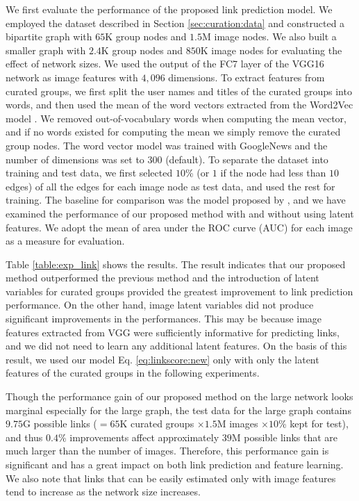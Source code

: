 \documentclass[letterpaper]{article} %
\begin{document}
We first evaluate the performance of the proposed link prediction model.
%
We employed  the dataset described in Section \ref{sec:curation:data} and constructed a bipartite graph with $65$K group nodes and $1.5$M image nodes.
%
We also built a smaller graph with $2.4$K group nodes and $850$K image nodes for evaluating the effect of network sizes.
%
We used the output of the FC7 layer of the VGG16 network as image features with $4,096$ dimensions.
%
To extract features from curated groups, we first split the user names and titles of the curated groups into words, and then used the mean of the word vectors extracted from the Word2Vec model \cite{Mikolov2013}.
%
We removed out-of-vocabulary words when computing the mean vector, and if no words existed for computing the mean we simply remove the curated group nodes.
%
The word vector model was trained with GoogleNews and the number of dimensions was set to 300 (default).
%
To separate the dataset into training and test data, we first selected $10$\% (or $1$ if the node had less than $10$ edges) of all the edges for each image node as test data, and used the rest for training.
%
The baseline for comparison was the model proposed by \cite{Menon2011}, and we have examined the performance of our proposed method with and without using latent features.
%
We adopt the mean of area under the ROC curve (AUC) for each image as a measure for evaluation.

Table \ref{table:exp_link} shows the results.
%
The result indicates that our proposed method outperformed the previous method and the introduction of latent variables for curated groups provided the greatest improvement to link prediction performance.
%
On the other hand, image latent variables did not produce significant improvements in the performances.
%
This may be because image features extracted from VGG were sufficiently informative for predicting links, and we did not need to learn any additional latent features.
%
On the basis of this result, we used our model Eq. \eqref{eq:linkscore:new} only with only the latent features of the curated groups in the following experiments.

Though the performance gain of our proposed method on the large network looks marginal especially for the large graph, the test data for the large graph contains $9.75$G possible links ($= 65$K curated groups $\times 1.5$M images $\times 10$\% kept for test), and thus $0.4$\% improvements affect approximately $39$M possible links that are much larger than the number of images.
%
Therefore, this performance gain is significant and has a great impact on both link prediction and feature learning.
%
We also note that links that can be easily estimated only with image features tend to increase as the network size increases.
\end{document}
